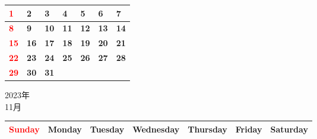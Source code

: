 \documentclass[a4paper,landscape]{jsarticle}
\newcommand{\dig}{\hspace{29mm}}
\newcommand{\tdig}{\hspace{27mm}}
\newcommand{\LBF}{\LARGE\textbf}
\begin{document}
\begingroup
\renewcommand{\arraystretch}{4}
\begin{tabular}{|p{32mm}|p{32mm}|p{32mm}|p{32mm}|p{32mm}|p{32mm}|p{32mm}|}
\hline
\raisebox{30pt} {\dig\textcolor{red}{\LBF{1}}}&\raisebox{30pt} {\dig\LBF{2}}&\raisebox{30pt} {\dig\LBF{3}}&\raisebox{30pt} {\dig\LBF{4}}&\raisebox{30pt} {\dig\LBF{5}}&\raisebox{30pt} {\dig\LBF{6}}&\raisebox{30pt} {\dig\LBF{7}}\\
\hline
\raisebox{30pt} {\dig\textcolor{red}{\LBF{8}}}&\raisebox{30pt} {\dig\LBF{9}}&\raisebox{30pt} {\tdig\LBF{10}}&\raisebox{30pt} {\tdig\LBF{11}}&\raisebox{30pt} {\tdig\LBF{12}}&\raisebox{30pt} {\tdig\LBF{13}}&\raisebox{30pt} {\tdig\LBF{14}}\\
\hline
\raisebox{30pt} {\tdig\textcolor{red}{\LBF{15}}}&\raisebox{30pt} {\tdig\LBF{16}}&\raisebox{30pt} {\tdig\LBF{17}}&\raisebox{30pt} {\tdig\LBF{18}}&\raisebox{30pt} {\tdig\LBF{19}}&\raisebox{30pt} {\tdig\LBF{20}}&\raisebox{30pt} {\tdig\LBF{21}}\\
\hline
\raisebox{30pt} {\tdig\textcolor{red}{\LBF{22}}}&\raisebox{30pt} {\tdig\LBF{23}}&\raisebox{30pt} {\tdig\LBF{24}}&\raisebox{30pt} {\tdig\LBF{25}}&\raisebox{30pt} {\tdig\LBF{26}}&\raisebox{30pt} {\tdig\LBF{27}}&\raisebox{30pt} {\tdig\LBF{28}}\\
\hline
\raisebox{30pt} {\tdig\textcolor{red}{\LBF{29}}}&\raisebox{30pt} {\tdig\LBF{30}}&\raisebox{30pt} {\tdig\LBF{31}}&&&&\\
\hline
\end{tabular}
\endgroup

\newpage

\begin{center}
	\LARGE 2023年\\
	\LARGE 11月
\end{center}

\begingroup
\renewcommand{\arraystretch}{1.4}
\begin{tabular}{|>{\centering\arraybackslash}p{32mm}|>{\centering\arraybackslash}p{32mm}|>{\centering\arraybackslash}p{32mm}|>{\centering\arraybackslash}p{32mm}|>{\centering\arraybackslash}p{32mm}|>{\centering\arraybackslash}p{32mm}|>{\centering\arraybackslash}p{32mm}|}
\hline
\textcolor{red}{\large Sunday}&\large Monday&\large Tuesday&\large Wednesday&\large Thursday&\large Friday&\large Saturday\\
\hline
\end{tabular}
\endgroup
\end{document}

